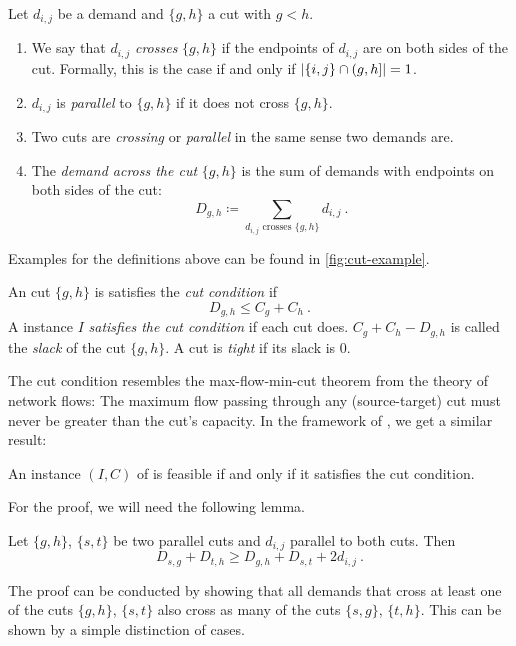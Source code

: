 \begin{definition}
	Let $d_{i, j}$ be a demand and $\{g, h\}$ a cut with $g < h$.
	\begin{enumerate}
		\item We say that $d_{i, j}$ \emph{crosses} $\{g, h\}$ if the endpoints of $d_{i, j}$ are on both sides of the cut.
		Formally, this is the case if and only if $\abs{\{i, j\} \cap (g, h]} = 1$.
		\item $d_{i, j}$ is \emph{parallel} to $\{g, h\}$ if it does not cross $\{g, h\}$.
		\item Two cuts are \emph{crossing} or \emph{parallel} in the same sense two demands are.
		\item The \emph{demand across the cut} $\{g, h\}$ is the sum of demands with endpoints on both sides of the cut:
		\begin{equation}
			\label{eq:cut-demand-definition}
			D_{g,h} \coloneqq \sum_{d_{i,j} \text{ crosses } \{g, h\} } d_{i, j}\ .
		\end{equation}
	\end{enumerate}
\end{definition}



Examples for the definitions above can be found in \cref{fig:cut-example}.

\begin{definition}
	An cut $\{g, h\}$ is satisfies the \emph{cut condition} if
	\begin{equation}
		D_{g,h} \leq C_g + C_h \ .
	\end{equation}
	A \RRLWC instance $I$ \emph{satisfies the cut condition} if each cut does.
	$C_g + C_h - D_{g,h}$ is called the \emph{slack} of the cut $\{g, h\}$.
	A cut is \emph{tight} if its slack is $0$.
\end{definition}

The cut condition resembles the max-flow-min-cut theorem from the theory of network flows:
The maximum flow passing through any (source-target) cut must never be greater than the cut's capacity.
In the framework of \RRLWC, we get a similar result:

\begin{theorem}
	\label{theo:cut-condition}
	An instance $(I, C)$ of \RRLWC is feasible if and only if it satisfies the cut condition.
\end{theorem}
For the proof, we will need the following lemma.

\begin{lemma}
	\label{lemma:parallel-diagonal-cuts}
	Let $\{g, h\}$, $\{s, t\}$ be two parallel cuts and $d_{i, j}$ parallel to both cuts.
	Then
	\begin{equation}
		D_{s,g} + D_{t,h} \geq D_{g,h} + D_{s,t} + 2 d_{i,j} \ .
	\end{equation}
\end{lemma}
The proof can be conducted by showing that all demands that cross at least one of the cuts $\{g, h\}$, $\{s, t\}$ also cross as many of the cuts $\{s, g\}$, $\{t, h\}$.
This can be shown by a simple distinction of cases.

